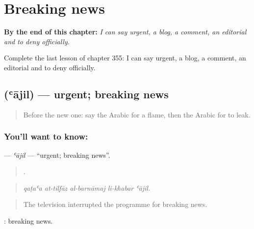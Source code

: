 
\chapter{Breaking news}
\label{ch:ar-breaking-news}

\begin{chapteropening}
\textbf{By the end of this chapter:} \emph{I can say urgent, a blog, a comment, an editorial and to deny officially.}

Complete the last lesson of chapter 355: I can say urgent, a blog, a comment, an editorial and to deny officially.
\end{chapteropening}

\section[\texorpdfstring{\ar{عاجل} (ʿājil)}{عاجل (ʿājil)}]{ (ʿājil) — urgent; breaking news}

\label{lesson:AR-C355-ajil}



\begin{quote}
Before the new one: say the Arabic for a flame, then the Arabic for to leak.
\end{quote}

\subsection*{You'll want to know: }
\textbf{} — \emph{ʿājil} — \textquotedblleft{}urgent; breaking news\textquotedblright{}.

\begin{quote}
    .
\end{quote}

\begin{quote}
\emph{qaṭaʿa at-tilfāz al-barnāmaj li-khabar ʿājil.}
\end{quote}

\begin{quote}
The television interrupted the programme for breaking news.
\end{quote}

 : breaking news.

